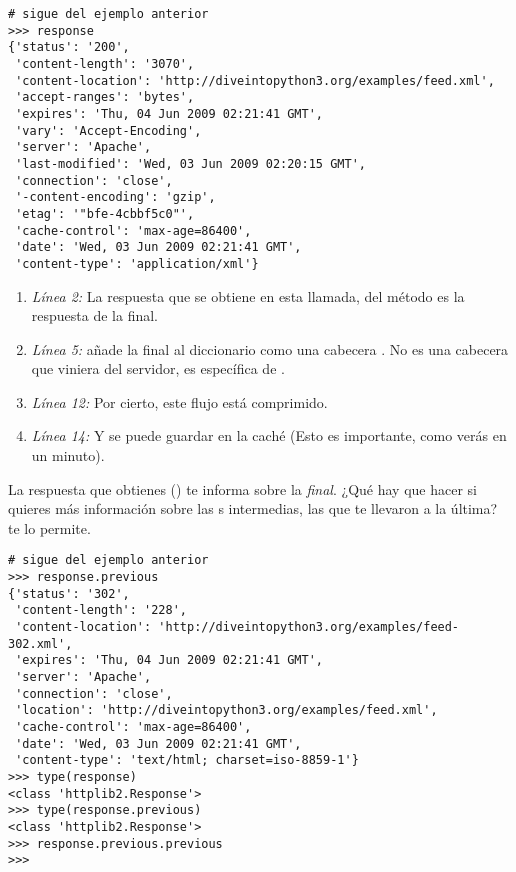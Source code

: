 \noindent\begin{minipage}{\textwidth}
\begin{lstlisting}[mathescape=True]
# sigue del ejemplo anterior
>>> response               
{'status': '200',
 'content-length': '3070',
 'content-location': 'http://diveintopython3.org/examples/feed.xml',
 'accept-ranges': 'bytes',
 'expires': 'Thu, 04 Jun 2009 02:21:41 GMT',
 'vary': 'Accept-Encoding',
 'server': 'Apache',
 'last-modified': 'Wed, 03 Jun 2009 02:20:15 GMT',
 'connection': 'close',
 '-content-encoding': 'gzip',                             
 'etag': '"bfe-4cbbf5c0"',
 'cache-control': 'max-age=86400',                       
 'date': 'Wed, 03 Jun 2009 02:21:41 GMT',
 'content-type': 'application/xml'}
\end{lstlisting}
\end{minipage}

\begin{enumerate}

\item \emph{Línea 2:} La respuesta que se obtiene en esta llamada,  del método  es la respuesta de la  final.

\item \emph{Línea 5:}  añade la  final al diccionario  como una cabecera . No es una cabecera que viniera del servidor, es específica de .

\item \emph{Línea 12:} Por cierto, este flujo está comprimido.

\item \emph{Línea 14:} Y se puede guardar en la caché (Esto es importante, como verás en un minuto).

\end{enumerate}

La respuesta que obtienes () te informa sobre la  \emph{final}. ¿Qué hay que hacer si quieres más información sobre las s intermedias, las que te llevaron a la última?  te lo permite.

\noindent\begin{minipage}{\textwidth}
\begin{lstlisting}[mathescape=True]
# sigue del ejemplo anterior
>>> response.previous      
{'status': '302',
 'content-length': '228',
 'content-location': 'http://diveintopython3.org/examples/feed-302.xml',
 'expires': 'Thu, 04 Jun 2009 02:21:41 GMT',
 'server': 'Apache',
 'connection': 'close',
 'location': 'http://diveintopython3.org/examples/feed.xml',
 'cache-control': 'max-age=86400',
 'date': 'Wed, 03 Jun 2009 02:21:41 GMT',
 'content-type': 'text/html; charset=iso-8859-1'}
>>> type(response)        
<class 'httplib2.Response'>
>>> type(response.previous)
<class 'httplib2.Response'>
>>> response.previous.previous 
>>>
\end{lstlisting}
\end{minipage}

